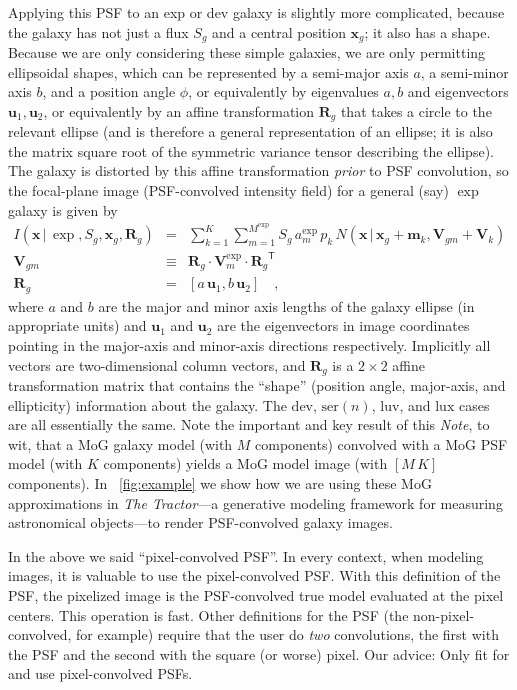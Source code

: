 \documentclass[12pt,pdftex,preprint]{aastex}
\newcommand{\documentname}{\textsl{Note}}
\newcommand{\project}[1]{\textsl{#1}}
\newcommand{\tmatrix}[1]{\boldsymbol{#1}}
\newcommand{\transpose}[1]{{#1}^{\mathsf T}}
\newcommand{\tvector}[1]{\boldsymbol{#1}}
\newcommand{\pos}{\tvector{x}}
\newcommand{\mean}{\tvector{m}}
\newcommand{\var}{\tmatrix{V}}
\newcommand{\affine}{\tmatrix{R}}
\newcommand{\uv}{\tvector{u}}
\newcommand{\normal}{N}
\newcommand{\given}{\,|\,}
\newcommand{\dev}{\mathrm{dev}}
\newcommand{\ser}{\mathrm{ser}}
\newcommand{\lux}{\mathrm{lux}}
\newcommand{\luv}{\mathrm{luv}}
\begin{document}
Applying this PSF to an exp or dev galaxy is slightly more
complicated, because the galaxy has not just a flux $S_g$ and a
central position $\pos_g$; it also has a shape.  Because we are only
considering these simple galaxies, we are only permitting ellipsoidal
shapes, which can be represented by a semi-major axis $a$, a
semi-minor axis $b$, and a position angle $\phi$, or equivalently by
eigenvalues $a, b$ and eigenvectors $\uv_1, \uv_2$, or equivalently by
an affine transformation $\affine_g$ that takes a circle to the
relevant ellipse (and is therefore a general representation of an
ellipse; it is also the matrix square root of the symmetric variance
tensor describing the ellipse).  The galaxy is distorted by this
affine transformation \emph{prior} to PSF convolution, so the
focal-plane image (PSF-convolved intensity field) for a general (say)
$\exp$ galaxy is given by
\begin{eqnarray}\displaystyle
I(\pos\given\exp,S_g,\pos_g,\affine_g) &=& \sum_{k=1}^K \sum_{m=1}^{M^{\exp}} S_g\,a^{\exp}_m\,p_k\,\normal(\pos\given\pos_g+\mean_k,\var_{gm}+\var_k)
\\
\var_{gm} &\equiv& \affine_g\cdot\var^{\exp}_m\cdot\transpose{\affine_g}
\\
\affine_g &=& \left[a\,\uv_1 , b\,\uv_2 \right]
\quad ,
\end{eqnarray}
where $a$ and $b$ are the major and minor axis lengths of the galaxy
ellipse (in appropriate units) and $\uv_1$ and $\uv_2$ are the
eigenvectors in image coordinates pointing in the major-axis and
minor-axis directions respectively.  Implicitly all vectors are
two-dimensional column vectors, and $\affine_g$ is a $2\times 2$
affine transformation matrix that contains the ``shape'' (position
angle, major-axis, and ellipticity) information about the galaxy.  The
$\dev$, $\ser(n)$, $\luv$, and $\lux$ cases are all essentially the
same.  Note the important and key result of this \documentname, to
wit, that a MoG galaxy model (with $M$ components) convolved with a
MoG PSF model (with $K$ components) yields a MoG model image (with
$[M\,K]$ components).  In \figurename~\ref{fig:example} we show how we
are using these MoG approximations in \project{The Tractor}---a
generative modeling framework for measuring astronomical objects---to
render PSF-convolved galaxy images.

In the above we said ``pixel-convolved PSF''.  In every context, when
modeling images, it is valuable to use the pixel-convolved PSF.  With
this definition of the PSF, the pixelized image is the PSF-convolved
true model evaluated at the pixel centers.  This operation is fast.
Other definitions for the PSF (the non-pixel-convolved, for example)
require that the user do \emph{two} convolutions, the first with the
PSF and the second with the square (or worse) pixel.  Our advice: Only
fit for and use pixel-convolved PSFs.
\end{document}
